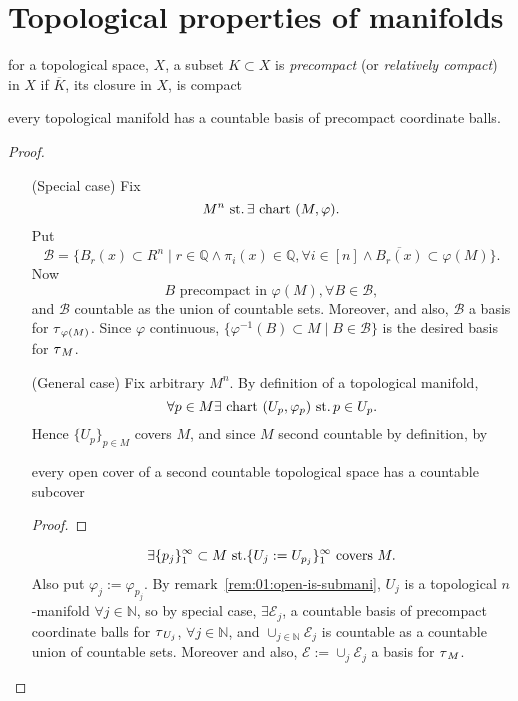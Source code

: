 \section{Topological properties of manifolds}
\begin{defn}
  for a topological space, $X$, a subset $K\subset X$ is
  \emph{precompact} (or \emph{relatively compact}) in $X$ if
  $\overline K$, its closure in $X$, is compact
\end{defn}

\begin{lem}\label{lem:1.6}\label{lem:01:tm-basis}
  every topological manifold has a countable basis
  of precompact coordinate balls.
\end{lem}
\begin{proof}\
  \begin{itemize}
  \item[(Special case)]
    Fix
    \[ M^n\operatorname{\,st.} \exists\text{ chart } (M,\varphi). \]
    Put
    \[
    \mathscr B = \{B_r(x)\subset R^n\mid
    r\in\mathbb Q\land \pi_i(x)\in\mathbb Q, \forall i\in[n] \land
    \overline{B_r(x)}\subset\varphi(M) \}.
    \]
    Now
    \[ B \text{ precompact in } \varphi(M), \forall B\in\mathscr B, \]
    \sketch{\attn todo: check.}
    and $\mathscr B$ countable as the union of countable sets.
    Moreover, and also, $\mathscr B$ a basis for
    $\operatorname{\tau}_{\varphi(M)}$.
    Since $\varphi$ continuous,
    $\{\varphi^{-1}(B)\subset M\mid B\in\mathscr B\}$
    is the desired basis for $\operatorname{\tau}_M$.
  \item[(General case)]
    Fix arbitrary $M^n$.
    By definition of a topological manifold,
    \[
    \forall p\in M\exists\text{ chart }(U_p, \varphi_p)\operatorname{\,st.} p\in U_p.
    \]
    Hence $\{U_p\}_{p\in M}$ covers $M$,
    and since $M$ second countable by definition, by
    \begin{fact}
      every open cover of a second countable topological space
      has a countable subcover
    \end{fact}
    \begin{proof}
    \end{proof}
    \[
    \exists \{p_j\}_1^\infty \subset M \operatorname{\,st.}
    \{U_j:=U_{p_j}\}_1^\infty \text{ covers } M.
    \]
    Also put $\varphi_j := \varphi_{p_j}$.
    By remark~\ref{rem:01:open-is-submani},
    $U_j$ is a topological $n$-manifold $\forall j\in\mathbb N$,
    so by special case,
    $\exists \mathcal E_j$,
    a countable basis of precompact coordinate balls for
    $\operatorname{\tau}_{U_j}$, $\forall j\in\mathbb N$,
    and $\cup_{j\in\mathbb N} \mathcal E_j$ is countable
    as a countable union of countable sets.
    Moreover and also,
    $\mathcal E:= \cup_j\mathcal E_j$ a basis for $\operatorname{\tau}_M$.


\end{itemize}
\end{proof}
